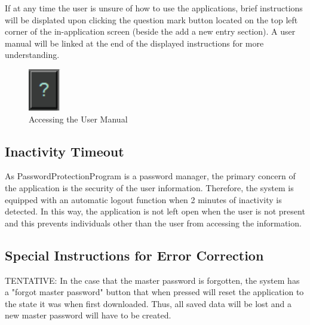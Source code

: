 \documentclass[12pt, titlepage]{article}
\begin{document}
If at any time the user is unsure of how to use the applications, brief instructions will be displated upon clicking the question mark button located on the top left corner of the in-application screen (beside the add a new entry section). A user manual will be linked at the end of the displayed instructions for more understanding. 

\begin{figure}[h]
	\centering
	\includegraphics[scale=1.0]{images/UserManual.PNG}
	\caption{Accessing the User Manual}
	\label{fig:UsMan}
\end{figure}

\subsection{Inactivity Timeout} \label{InacTime}

As PasswordProtectionProgram is a password manager, the primary concern of the application is the security of the user information. Therefore, the system is equipped with an automatic logout function when 2 minutes of inactivity is detected. In this way, the application is not left open when the user is not present and this prevents individuals other than the user from accessing the information.

\subsection{Special Instructions for Error Correction} \label{ErrCorr}

TENTATIVE: In the case that the master password is forgotten, the system has a "forgot master password" button that when pressed will reset the application to the state it was when first downloaded. Thus, all saved data will be lost and a new master password will have to be created.

\newpage



\end{document}

